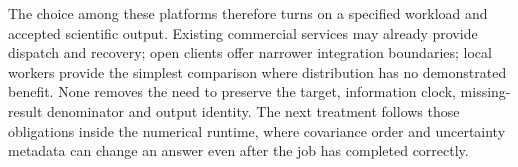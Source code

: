 The choice among these platforms therefore turns on a specified workload and accepted scientific output. Existing commercial services may already provide dispatch and recovery; open clients offer narrower integration boundaries; local workers provide the simplest comparison where distribution has no demonstrated benefit. None removes the need to preserve the target, information clock, missing-result denominator and output identity. The next treatment follows those obligations inside the numerical runtime, where covariance order and uncertainty metadata can change an answer even after the job has completed correctly.
